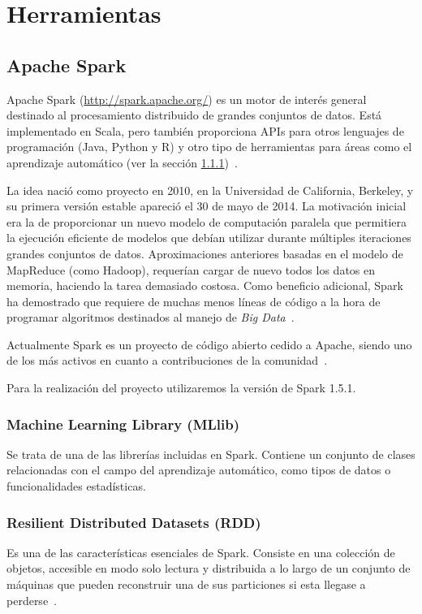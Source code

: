 \section{Herramientas}

\subsection{Apache Spark}\label{sec:DefSpark}

Apache Spark (\url{http://spark.apache.org/}) es un motor de interés general destinado al procesamiento distribuido de grandes conjuntos de datos. Está implementado en Scala, pero también proporciona APIs para otros lenguajes de programación (Java, Python y R) y otro tipo de herramientas para áreas como el aprendizaje automático (ver la sección \ref{MLib})~\cite{SparkDoc}.

La idea nació como proyecto en 2010, en la Universidad de California, Berkeley, y su primera versión estable apareció el 30 de mayo de 2014. La motivación inicial era la de proporcionar un nuevo modelo de computación paralela que permitiera la ejecución eficiente de modelos que debían utilizar durante múltiples iteraciones grandes conjuntos de datos. Aproximaciones anteriores basadas en el modelo de MapReduce (como Hadoop), requerían cargar de nuevo todos los datos en memoria, haciendo la tarea demasiado costosa. Como beneficio adicional, Spark ha demostrado que requiere de muchas menos líneas de código a la hora de programar algoritmos destinados al manejo de \textit{Big Data}~\cite{SparkPaper}.

Actualmente Spark es un proyecto de código abierto cedido a Apache, siendo uno de los más activos en cuanto a contribuciones de la comunidad~\cite{ApacheContributions}. 

Para la realización del proyecto utilizaremos la versión de Spark 1.5.1.

\subsubsection{Machine Learning Library (MLlib)}\label{MLib}

Se trata de una de las librerías incluidas en Spark. Contiene un conjunto de clases relacionadas con el campo del aprendizaje automático, como tipos de datos o funcionalidades estadísticas.  

\subsubsection{Resilient Distributed Datasets (RDD)}\label{sec:DefRDD}
Es una de las características esenciales de Spark. Consiste en una colección de objetos, accesible en modo solo lectura y distribuida a lo largo de un conjunto de máquinas que pueden reconstruir una de sus particiones si esta llegase a perderse~\cite{SparkPaper}. 

